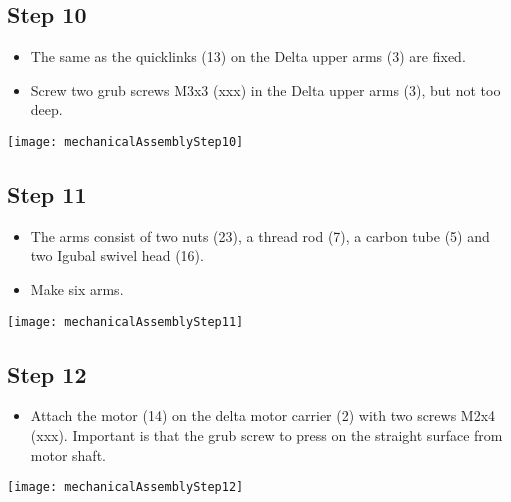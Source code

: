 \subsection*{Step 10}

\begin{minipage}[t]{0.6\textwidth}
	\begin{itemize}
		\item The same as the quicklinks (13) on the Delta upper arms (3) are fixed.
		\item Screw two grub screws M3x3 (xxx) in the Delta upper arms (3), but not too deep.
	\end{itemize}
\end{minipage}
\hfill
\begin{minipage}[t]{0.35\textwidth}
	\vspace{-\ht\strutbox}\texttt{[image: mechanicalAssemblyStep10]}
	\label{fig:MechanicalAssebmlyStep10} 
\end{minipage}

\subsection*{Step 11}

\begin{minipage}[t]{0.6\textwidth}
	\begin{itemize}
		\item The arms consist of two nuts (23), a thread rod (7), a carbon tube (5) and two Igubal swivel head (16).
		\item Make six arms.
	\end{itemize}
\end{minipage}
\hfill
\begin{minipage}[t]{0.35\textwidth}
	\vspace{-\ht\strutbox}\texttt{[image: mechanicalAssemblyStep11]}
	\label{fig:MechanicalAssebmlyStep11} 
\end{minipage}

\subsection*{Step 12}

\begin{minipage}[t]{0.6\textwidth}
	\begin{itemize}
		\item Attach the motor (14) on the delta motor carrier (2) with two screws M2x4 (xxx). Important is that the grub screw to press on the straight surface from motor shaft.
	\end{itemize}
\end{minipage}
\hfill
\begin{minipage}[t]{0.35\textwidth}
	\vspace{-\ht\strutbox}\texttt{[image: mechanicalAssemblyStep12]}
	\label{fig:MechanicalAssebmlyStep12} 
\end{minipage}

